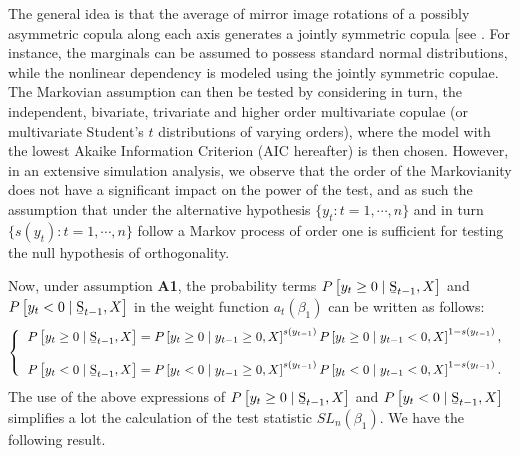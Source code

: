 \documentclass[harvard,11pt]{article}
\begin{document}
 The general idea is that the average of mirror image rotations of a possibly asymmetric copula along each axis generates a jointly symmetric copula [see \citet{oh2016high}. For instance, the marginals can be assumed to possess standard normal distributions, while the nonlinear dependency is modeled using the jointly symmetric copulae. The Markovian assumption can then be tested by considering in turn, the independent, bivariate, trivariate and higher order multivariate copulae (or multivariate Student's $t$ distributions of varying orders), where the model with the lowest Akaike Information Criterion (AIC hereafter) is then chosen. However, in an extensive simulation analysis, we observe that the order of the Markovianity does not have a significant impact on the power of the test, and as such the assumption that under the alternative hypothesis $\{y_t:t=1,\cdots,n\}$ and in turn $\{s(y_t):t=1,\cdots,n\}$ follow a Markov process of order one is sufficient for testing the null hypothesis of orthogonality. 

 Now, under assumption \textbf{A1}, the probability terms $P\left[
y_{t}\geq 0\mid \text{\b{S}}_{t-1},X\right] $ and $P\left[
y_{t}<0\mid \text{\b{S}}_{t-1},X\right] $ in the weight function $a_{t}(\beta
_{1})$ can be written as follows:%
\begin{equation*}
\left\{ 
\begin{tabular}{l}
$P\left[ y_{t}\geq 0\mid \text{\b{S}}_{t-1},X\right] =P%
\left[ y_{t}\geq 0\mid y_{t-1}\geq 0,X\right] ^{s(y_{t-1})}P\left[
y_{t}\geq 0\mid y_{t-1}<0,X\right] ^{1-s(y_{t-1})},$ \\ 
\\ 
$P\left[ y_{t}<0\mid \text{\b{S}}_{t-1},X\right] =P\left[
y_{t}<0\mid y_{t-1}\geq 0,X\right] ^{s(y_{t-1})}P\left[ y_{t}<0\mid
y_{t-1}<0,X\right] ^{1-s(y_{t-1})}.$%
\end{tabular}%
\right. 
\end{equation*}%
The use of the above expressions of $P\left[ y_{t}\geq 0\mid \text{%
\b{S}}_{t-1},X\right] $ and $P\left[ y_{t}<0\mid \text{\b{S}}%
_{t-1},X\right] $ simplifies a lot the calculation of the test statistic $%
SL_{n}(\beta _{1})$. We have the following result.
\end{document}
